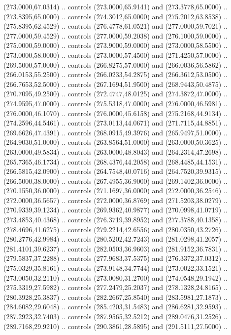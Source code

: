   (273.0000,67.0314) .. controls (273.0000,65.9141) and (273.3778,65.0000) ..
  (273.8395,65.0000) .. controls (274.3012,65.0000) and (275.2012,63.8538) ..
  (275.8395,62.4529) .. controls (276.4778,61.0521) and (277.0000,59.7021) ..
  (277.0000,59.4529) .. controls (277.0000,59.2038) and (276.1000,59.0000) ..
  (275.0000,59.0000) .. controls (273.9000,59.0000) and (273.0000,58.5500) ..
  (273.0000,58.0000) .. controls (273.0000,57.4500) and (271.4250,57.0000) ..
  (269.5000,57.0000) .. controls (266.8275,57.0000) and (266.0036,56.5862) ..
  (266.0153,55.2500) .. controls (266.0233,54.2875) and (266.3612,53.0500) ..
  (266.7653,52.5000) .. controls (267.1694,51.9500) and (268.9443,50.4875) ..
  (270.7095,49.2500) .. controls (272.4747,48.0125) and (274.3872,47.0000) ..
  (274.9595,47.0000) .. controls (275.5318,47.0000) and (276.0000,46.5981) ..
  (276.0000,46.1070) .. controls (276.0000,45.6158) and (275.2168,44.9134) ..
  (274.2596,44.5461) .. controls (273.0113,44.0671) and (271.7115,44.8851) ..
  (269.6626,47.4391) .. controls (268.0915,49.3976) and (265.9497,51.0000) ..
  (264.9030,51.0000) .. controls (263.8564,51.0000) and (263.0000,50.3625) ..
  (263.0000,49.5834) .. controls (263.0000,48.8043) and (264.2314,47.2698) ..
  (265.7365,46.1734) .. controls (268.4376,44.2058) and (268.4485,44.1531) ..
  (266.5815,42.0900) .. controls (264.7548,40.0716) and (264.7520,39.9315) ..
  (266.5000,38.0000) .. controls (267.4955,36.9000) and (269.1402,36.0000) ..
  (270.1550,36.0000) .. controls (271.1697,36.0000) and (272.0000,36.2546) ..
  (272.0000,36.5657) .. controls (272.0000,36.8769) and (271.5203,38.0279) ..
  (270.9339,39.1234) .. controls (269.9362,40.9877) and (270.0998,41.0719) ..
  (273.4853,40.4368) .. controls (276.3719,39.8952) and (277.3788,40.1358) ..
  (278.4696,41.6275) .. controls (279.2214,42.6556) and (280.0350,43.2726) ..
  (280.2776,42.9984) .. controls (280.5202,42.7243) and (281.0298,41.2057) ..
  (281.4101,39.6237) .. controls (282.0503,36.9603) and (281.9152,36.7831) ..
  (279.5837,37.2288) .. controls (277.9683,37.5375) and (276.3372,37.0312) ..
  (275.0329,35.8161) .. controls (273.9148,34.7744) and (273.0022,33.1521) ..
  (273.0050,32.2110) .. controls (273.0080,31.2700) and (274.0548,29.1942) ..
  (275.3319,27.5982) .. controls (277.2479,25.2037) and (278.1328,24.8165) ..
  (280.3928,25.3837) .. controls (282.2667,25.8540) and (283.5981,27.1873) ..
  (284.6082,29.6048) .. controls (285.4203,31.5483) and (286.6281,32.9593) ..
  (287.2923,32.7403) .. controls (287.9565,32.5212) and (289.0476,31.2526) ..
  (289.7168,29.9210) .. controls (290.3861,28.5895) and (291.5111,27.5000) ..
